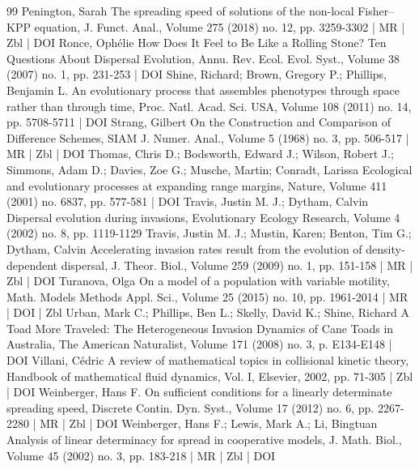 \begin{thebibliography}{99}
Penington, Sarah The spreading speed of solutions of the non-local Fisher–KPP equation, J. Funct. Anal., Volume 275 (2018) no. 12, pp. 3259-3302 | MR | Zbl | DOI
Ronce, Ophélie How Does It Feel to Be Like a Rolling Stone? Ten Questions About Dispersal Evolution, Annu. Rev. Ecol. Evol. Syst., Volume 38 (2007) no. 1, pp. 231-253 | DOI
Shine, Richard; Brown, Gregory P.; Phillips, Benjamin L. An evolutionary process that assembles phenotypes through space rather than through time, Proc. Natl. Acad. Sci. USA, Volume 108 (2011) no. 14, pp. 5708-5711 | DOI
Strang, Gilbert On the Construction and Comparison of Difference Schemes, SIAM J. Numer. Anal., Volume 5 (1968) no. 3, pp. 506-517 | MR | Zbl | DOI
Thomas, Chris D.; Bodsworth, Edward J.; Wilson, Robert J.; Simmons, Adam D.; Davies, Zoe G.; Musche, Martin; Conradt, Larissa Ecological and evolutionary processes at expanding range margins, Nature, Volume 411 (2001) no. 6837, pp. 577-581 | DOI
Travis, Justin M. J.; Dytham, Calvin Dispersal evolution during invasions, Evolutionary Ecology Research, Volume 4 (2002) no. 8, pp. 1119-1129
Travis, Justin M. J.; Mustin, Karen; Benton, Tim G.; Dytham, Calvin Accelerating invasion rates result from the evolution of density-dependent dispersal, J. Theor. Biol., Volume 259 (2009) no. 1, pp. 151-158 | MR | Zbl | DOI
Turanova, Olga On a model of a population with variable motility, Math. Models Methods Appl. Sci., Volume 25 (2015) no. 10, pp. 1961-2014 | MR | DOI | Zbl
Urban, Mark C.; Phillips, Ben L.; Skelly, David K.; Shine, Richard A Toad More Traveled: The Heterogeneous Invasion Dynamics of Cane Toads in Australia, The American Naturalist, Volume 171 (2008) no. 3, p. E134-E148 | DOI
Villani, Cédric A review of mathematical topics in collisional kinetic theory, Handbook of mathematical fluid dynamics, Vol. I, Elsevier, 2002, pp. 71-305 | Zbl | DOI
Weinberger, Hans F. On sufficient conditions for a linearly determinate spreading speed, Discrete Contin. Dyn. Syst., Volume 17 (2012) no. 6, pp. 2267-2280 | MR | Zbl | DOI
Weinberger, Hans F.; Lewis, Mark A.; Li, Bingtuan Analysis of linear determinacy for spread in cooperative models, J. Math. Biol., Volume 45 (2002) no. 3, pp. 183-218 | MR | Zbl | DOI
\end{thebibliography}
